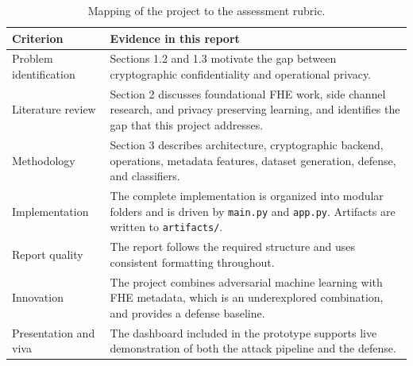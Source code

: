 \documentclass[12pt,a4paper]{article}
\begin{document}
\begin{table}[h]
\centering
\caption{Mapping of the project to the assessment rubric.}
\label{tab:rubric}
\renewcommand{\arraystretch}{1.25}
\begin{tabular}{p{4.2cm}p{10.2cm}}
\toprule
\textbf{Criterion} & \textbf{Evidence in this report} \\
\midrule
Problem identification     & Sections 1.2 and 1.3 motivate the gap between cryptographic confidentiality and operational privacy. \\
Literature review          & Section 2 discusses foundational FHE work, side channel research, and privacy preserving learning, and identifies the gap that this project addresses. \\
Methodology                & Section 3 describes architecture, cryptographic backend, operations, metadata features, dataset generation, defense, and classifiers. \\
Implementation             & The complete implementation is organized into modular folders and is driven by \texttt{main.py} and \texttt{app.py}. Artifacts are written to \texttt{artifacts/}. \\
Report quality             & The report follows the required structure and uses consistent formatting throughout. \\
Innovation                 & The project combines adversarial machine learning with FHE metadata, which is an underexplored combination, and provides a defense baseline. \\
Presentation and viva      & The dashboard included in the prototype supports live demonstration of both the attack pipeline and the defense. \\
\bottomrule
\end{tabular}
\end{table}
\end{document}
